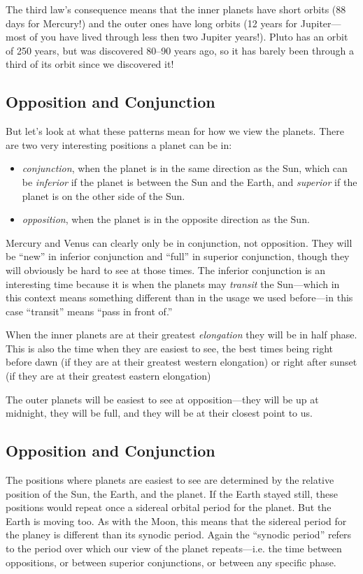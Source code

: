 \documentclass[12pt, preprint]{aastex}
\begin{document}
The third law's consequence means that the inner planets have short
orbits (88 days for Mercury!) and the outer ones have long orbits (12
years for Jupiter---most of you have lived through less then two
Jupiter years!). Pluto has an orbit of 250 years, but was discovered
80--90 years ago, so it has barely been through a third of its orbit
since we discovered it!

\subsection{Opposition and Conjunction}

But let's look at what these patterns mean for how we view the
planets. There are two very interesting positions a planet can be in:
\begin{itemize}
\item {\it conjunction}, when the planet is in the same direction as
  the Sun, which can be {\it inferior} if the planet is between the
  Sun and the Earth, and {\it superior} if the planet is on the other
  side of the Sun.
\item {\it opposition}, when the planet is in the opposite direction
  as the Sun.
\end{itemize}

Mercury and Venus can clearly only be in conjunction, not
opposition. They will be ``new'' in inferior conjunction and ``full''
in superior conjunction, though they will obviously be hard to see at
those times. The inferior conjunction is an interesting time because
it is when the planets may {\it transit} the Sun---which in this
context means something different than in the usage we used
before---in this case ``transit'' means ``pass in front of.''

When the inner planets are at their greatest {\it elongation} they
will be in half phase. This is also the time when they are easiest to
see, the best times being right before dawn (if they are at their
greatest western elongation) or right after sunset (if they are at
their greatest eastern elongation)

The outer planets will be easiest to see at opposition---they will be
up at midnight, they will be full, and they will be at their closest
point to us.

\subsection{Opposition and Conjunction}

The positions where planets are easiest to see are determined by the
relative position of the Sun, the Earth, and the planet. If the Earth
stayed still, these positions would repeat once a sidereal orbital
period for the planet. But the Earth is moving too. As with the Moon,
this means that the sidereal period for the planey is different than
its synodic period. Again the ``synodic period'' refers to the period
over which our view of the planet repeats---i.e. the time between
oppositions, or between superior conjunctions, or between any specific
phase.
\end{document}

